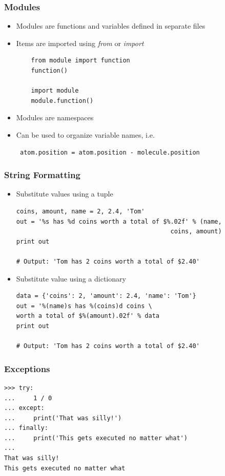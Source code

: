 \documentclass[12pt,handout]{beamer}
\begin{document}
\begin{frame}[fragile]
\frametitle{Modules}
\begin{itemize}
\item Modules are functions and variables defined in 
separate files
\item Items are imported using {\it from} or {\it import}
\small{
\begin{verbatim}
    from module import function
    function()

    import module
    module.function()
\end{verbatim}
}
\item Modules are namespaces
\item Can be used to organize variable names, i.e.
\small{
\begin{verbatim}
 atom.position = atom.position - molecule.position
\end{verbatim}
}
\end{itemize}
\end{frame}

\begin{frame}[fragile]
\frametitle{String Formatting}
\begin{itemize}
\item Substitute values using a tuple
\small{
\begin{verbatim}
coins, amount, name = 2, 2.4, 'Tom'
out = '%s has %d coins worth a total of $%.02f' % (name,
                                          coins, amount)
print out

# Output: 'Tom has 2 coins worth a total of $2.40'
\end{verbatim}
}
\item Substitute value using a dictionary
\small{
\begin{verbatim}
data = {'coins': 2, 'amount': 2.4, 'name': 'Tom'}
out = '%(name)s has %(coins)d coins \
worth a total of $%(amount).02f' % data
print out

# Output: 'Tom has 2 coins worth a total of $2.40'
\end{verbatim}
}

\end{itemize}
\end{frame}


\begin{frame}[fragile]
\frametitle{Exceptions}
\small{
\begin{verbatim}
>>> try:
...     1 / 0
... except:
...     print('That was silly!')
... finally:
...     print('This gets executed no matter what')
... 
That was silly!
This gets executed no matter what
\end{verbatim}
}
\end{frame}
\end{document}
